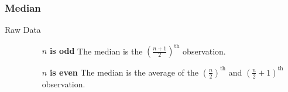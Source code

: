 \documentclass[
10pt, %
a4paper, %
]{report}
\begin{document}
\subsubsection*{Median}
\begin{description}
\item[Raw Data]
\begin{itemize}
\item[]
\item[\(n\) \textbf{is odd}] The median is the \(\left( \frac{n+1}{2} \right)^\text{th}\) observation.

\item[\(n\) \textbf{is even}]  The median is the average of the \(\left( \frac{n}{2} \right)^\text{th}\) and \(\left( \frac{n}{2} + 1 \right)^\text{th}\) observation.
\end{itemize}



\end{description}
\end{document}

